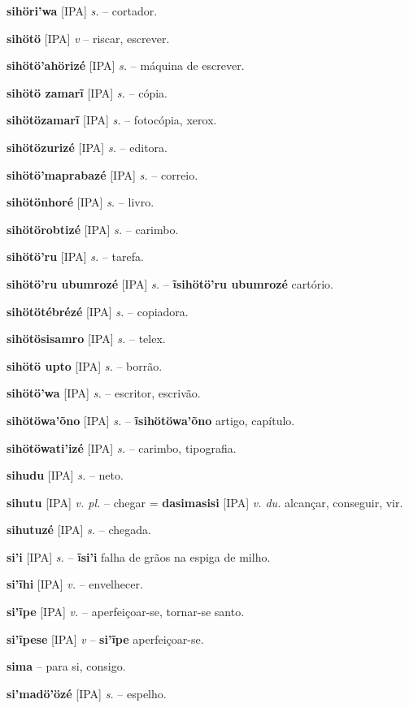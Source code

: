\textbf{sihöri'wa} [IPA] \textit{s.} -- cortador.

\textbf{sihötö} [IPA] \textit{v} -- riscar, escrever.

\textbf{sihötö'ahörizé} [IPA] \textit{s.} -- máquina de escrever.

\textbf{sihötö zamarĩ} [IPA] \textit{s.} -- cópia.

\textbf{sihötözamarĩ} [IPA] \textit{s.} -- fotocópia, xerox.

\textbf{sihötözurizé} [IPA] \textit{s.} -- editora.

\textbf{sihötö'maprabazé} [IPA] \textit{s.} -- correio.

\textbf{sihötönhoré} [IPA] \textit{s.} -- livro.

\textbf{sihötörobtizé} [IPA] \textit{s.} -- carimbo.

\textbf{sihötö'ru} [IPA] \textit{s.} -- tarefa.

\textbf{sihötö'ru ubumrozé} [IPA] \textit{s.} -- \textbf{ĩsihötö'ru ubumrozé} cartório.

\textbf{sihötötébrézé} [IPA] \textit{s.} -- copiadora.

\textbf{sihötösisamro} [IPA] \textit{s.} -- telex.

\textbf{sihötö upto} [IPA] \textit{s.} -- borrão.

\textbf{sihötö'wa} [IPA] \textit{s.} -- escritor, escrivão.

\textbf{sihötöwa'õno} [IPA] \textit{s.} -- \textbf{ĩsihötöwa'õno} artigo, capítulo.

\textbf{sihötöwati'izé} [IPA] \textit{s.} -- carimbo, tipografia.

\textbf{sihudu} [IPA] \textit{s.} -- neto.

\textbf{sihutu} [IPA] \textit{v. pl.} -- chegar = \textbf{dasimasisi} [IPA] \textit{v. du.} alcançar, conseguir, vir.

\textbf{sihutuzé} [IPA] \textit{s.} -- chegada.

\textbf{si'i} [IPA] \textit{s.} -- \textbf{ĩsi'i} falha de grãos na espiga de milho.

\textbf{si'ĩhi} [IPA] \textit{v.} -- envelhecer.

\textbf{si'ĩpe} [IPA] \textit{v.} -- aperfeiçoar-se, tornar-se santo.

\textbf{si'ĩpese} [IPA] \textit{v} -- \textbf{si'ĩpe} aperfeiçoar-se.

\textbf{sima} -- para si, consigo.

\textbf{si'madö'özé} [IPA] \textit{s.} -- espelho.

